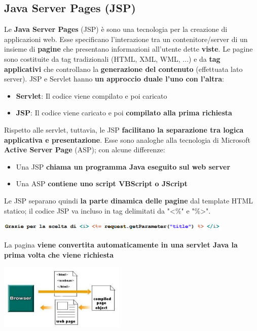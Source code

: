 \documentclass[12pt]{article}
\begin{document}
\subsection{Java Server Pages (JSP)}
Le \textbf{Java Server Pages} (JSP) è sono una tecnologia per la creazione di applicazioni web. Esse specificano l'interazione tra un contenitore/server di un insieme di \textbf{pagine}
che presentano informazioni all'utente dette \textbf{viste}.
Le pagine sono costituite da tag tradizionali (HTML, XML, WML, ...) e da \textbf{tag applicativi} che controllano la \textbf{generazione del contenuto} (effettuata lato server).
JSP e Servlet hanno \textbf{un approccio duale l'uno con l'altra}:
\begin{itemize}
    \item \textbf{Servlet}: Il codice viene compilato e poi caricato
    \item \textbf{JSP}: Il codice viene caricato e poi \textbf{compilato alla prima richiesta}
\end{itemize}
Rispetto alle servlet, tuttavia, le JSP \textbf{facilitano la separazione tra logica applicativa e presentazione}. Esse sono analoghe
alla tecnologia di Microsoft \textbf{Active Server Page} (ASP); con alcune differenze:
\begin{itemize}
    \item Una JSP \textbf{chiama un programma Java eseguito sul web server}
    \item Una ASP \textbf{contiene uno script VBScript o JScript}
\end{itemize}
Le JSP separano quindi \textbf{la parte dinamica delle pagine} dal template HTML statico; il codice JSP
va incluso in tag delimitati da "<\%" e "\%>".
\begin{center}
    \includegraphics[width = 0.85\textwidth]{Images/190.png}
\end{center}
\newpage
\noindent
La pagina \textbf{viene convertita automaticamente in una servlet Java la prima volta che viene richiesta}
\begin{center}
    \includegraphics[width = 0.45\textwidth]{Images/191.png}
\end{center}
\end{document}
